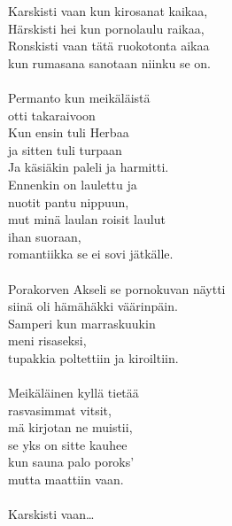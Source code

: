 
            Karskisti vaan kun kirosanat kaikaa, \\
            Härskisti hei kun pornolaulu raikaa, \\
            Ronskisti vaan tätä ruokotonta aikaa  \\
            kun rumasana sanotaan niinku se on. \\
\hspace{10mm} \\
            Permanto kun meikäläistä  \\
            otti takaraivoon \\
            Kun ensin tuli Herbaa  \\
            ja sitten tuli turpaan \\
            Ja käsiäkin paleli ja harmitti. \\
            Ennenkin on laulettu ja  \\
            nuotit pantu nippuun, \\
            mut minä laulan roisit laulut \\
            ihan suoraan, \\
            romantiikka se ei sovi jätkälle. \\
\hspace{10mm} \\
            Porakorven Akseli se pornokuvan näytti  \\
            siinä oli hämähäkki väärinpäin. \\
            Samperi kun marraskuukin  \\
            meni risaseksi, \\
            tupakkia poltettiin ja kiroiltiin. \\
\hspace{10mm} \\
            Meikäläinen kyllä tietää  \\
            rasvasimmat vitsit, \\
            mä kirjotan ne muistii,  \\
            se yks on sitte kauhee  \\
            kun sauna palo poroks’  \\
            mutta maattiin vaan. \\
\hspace{10mm} \\
            Karskisti vaan… \\
\hspace{10mm} \\
